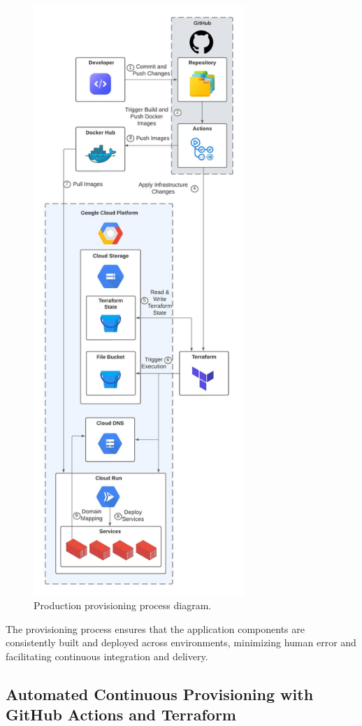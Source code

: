 \documentclass[a4paper,fleqn]{cas-dc}
\begin{document}
\begin{figure}[h]
\centering
\includegraphics[width=8cm]{provisioning.jpeg}
\caption{Production provisioning process diagram.}
\label{fig:provisioning}
\end{figure}

The provisioning process ensures that the application components are consistently built and deployed across environments, minimizing human error and facilitating continuous integration and delivery.

\subsection{Automated Continuous Provisioning with GitHub Actions and Terraform}
\end{document}
